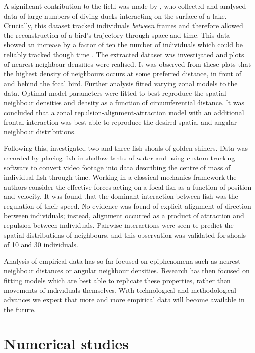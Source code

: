 A significant contribution to the field was made by \textcite{lukeman10}, who
collected and analysed data of large numbers of diving ducks interacting on the
surface of a lake. Crucially, this dataset tracked individuals \emph{between}
frames and therefore allowed the reconstruction of a bird's trajectory through
space and time. This data showed an increase by a factor of ten the number of
individuals which could be reliably tracked though time \parencite{lukeman09}.
The extracted dataset was investigated and plots of nearest neighbour densities
were realised. It was observed from these plots that the highest density of
neighbours occurs at some preferred distance, in front of and behind the focal
bird. Further analysis fitted varying zonal models to the data. Optimal model
parameters were fitted to best reproduce the spatial neighbour densities and
density as a function of circumferential distance. It was concluded that a
zonal repulsion-alignment-attraction model with an additional frontal
interaction was best able to reproduce the desired spatial and angular
neighbour distributions.

Following this, \cite{katz11} investigated two and three fish shoals of golden
shiners. Data was recorded by placing fish in shallow tanks of water and using
custom tracking software to convert video footage into data describing the
centre of mass of individual fish through time. Working in a classical
mechanics framework the authors consider the effective forces acting on a focal
fish as a function of position and velocity. It was found that the dominant
interaction between fish was the regulation of their speed. No evidence was
found of explicit alignment of direction between individuals; instead,
alignment occurred as a product of attraction and repulsion between
individuals. Pairwise interactions were seen to predict the spatial
distributions of neighbours, and this observation was validated for shoals of
10 and 30 individuals.

Analysis of empirical data has so far focused on epiphenomena such as nearest
neighbour distances or angular neighbour densities. Research has then focused
on fitting models which are best able to replicate these properties, rather
than movements of individuals themselves. With technological and methodological
advances we expect that more and more empirical data will become available in
the future.

\section{Numerical studies}
\label{sec:numerical_studies}

